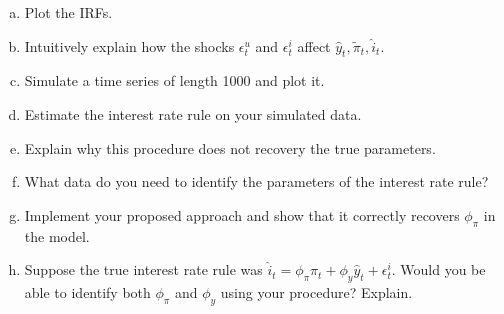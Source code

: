 \documentclass{article}
\newcommand{\1}{\mathbf{1}}
\begin{document}
\begin{enumerate}[(a)]
	\item Plot the IRFs. 
	\item Intuitively explain how the shocks $\epsilon^u_t$ and $\epsilon^i_t$ affect $\hat{y}_t,\tilde{\pi}_t,\hat{i}_t$.
	\item Simulate a time series of length 1000 and plot it.
	\item Estimate the interest rate rule on your simulated data.
	\item Explain why this procedure does not recovery the true parameters.
	\item What data do you need to identify the parameters of the interest rate rule?
	\item Implement your proposed approach and show that it correctly recovers $\phi_\pi$ in the model.
	\item Suppose the true interest rate rule was $\hat{i}_t= \phi_\pi\hat{\pi}_t + \phi_y\hat{y}_t + \epsilon^i_t$. Would you be able to identify both $\phi_\pi$ and $\phi_y$ using your procedure? Explain.

\end{enumerate}
\end{document}
